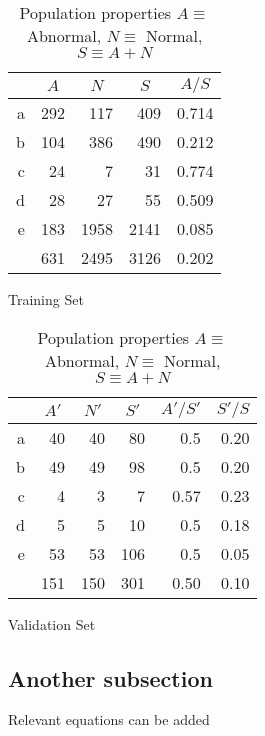 \documentclass{project-logbook}
\begin{document}
				\begin{table}[ht]
					\centering
						\begin{subtable}{0.48\textwidth}
							\centering
        								\begin{tabular}{*{5}{r}}
									{}  & \multicolumn{1}{c}{$A$} & \multicolumn{1}{c}{$N$} & \multicolumn{1}{c}{$S$} & \multicolumn{1}{c}{$A/S$} \\
									\midrule
									a & 292 & 117   & 409   & 0.714 \\
									b & 104 & 386   & 490   & 0.212 \\
									c & 24  & 7     & 31    & 0.774 \\
									d & 28  & 27    & 55    & 0.509 \\
									e & 183 & 1958  & 2141  & 0.085 \\
									\midrule
									& 631 & 2495 & 3126 & 0.202 \\
								\end{tabular}
							\caption{Training Set}
						\end{subtable}
    						\begin{subtable}{0.48\textwidth}
        							\centering
        								\begin{tabular}{*{6}{r}}
									{}  & \multicolumn{1}{c}{$A'$} & \multicolumn{1}{c}{$N'$} & \multicolumn{1}{c}{$S'$} & \multicolumn{1}{c}{$A'/S'$} & $S'/S$ \\
									\midrule
									a & 40  & 40    & 80    & 0.5   & 0.20 \\
									b & 49  & 49    & 98    & 0.5   & 0.20 \\
									c & 4   & 3     & 7     & 0.57  & 0.23 \\
									d & 5   & 5     & 10    & 0.5   & 0.18 \\
									e & 53  & 53    & 106   & 0.5   & 0.05 \\
									\midrule
									& 151 & 150 & 301 & 0.50 & 0.10 \\
								\end{tabular}
								\caption{Validation Set}
						\end{subtable}

    						\caption{Population properties $A \equiv$ Abnormal, $N\equiv$ Normal, $S\equiv A+N$}
    						\label{tab:populations}
				\end{table}

	\subsection{Another subsection} \label{sub:another_subsection}
		Relevant equations can be added
\end{document}
